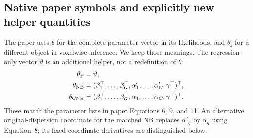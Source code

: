 \documentclass[11pt,a4paper]{article}
\numberwithin{equation}{section}
\begin{document}
\subsection{Native paper symbols and explicitly new helper quantities}
The paper uses $\theta$ for the complete parameter vector in its
likelihoods, and $\theta_j$ for a different object in voxelwise inference.
We keep those meanings. The regression-only vector $\vartheta$
is an additional helper, not a redefinition of $\theta$:
\begin{align}
 \theta_{\rm P}&=\vartheta,\\
 \theta_{\rm NB}
 &=(\beta_1^\top,\ldots,\beta_G^\top,
                 \alpha'_1,\ldots,\alpha'_G,\gamma^\top)^\top,\\
 \theta_{\rm CNB}
 &=(\beta_1^\top,\ldots,\beta_G^\top,
                 \alpha_1,\ldots,\alpha_G,\gamma^\top)^\top .
\end{align}
These match the parameter lists in paper Equations 6, 9, and 11.
An alternative original-dispersion coordinate for the matched NB
replaces $\alpha'_g$ by $\alpha_g$ using Equation~8; its fixed-coordinate
derivatives are distinguished below.
\end{document}

